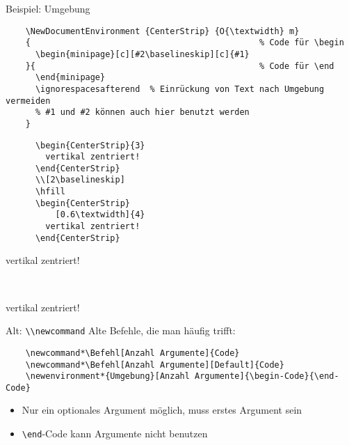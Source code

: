 \begin{frame}[fragile]{Beispiel: Umgebung}
  \begin{lstlisting}
    \NewDocumentEnvironment {CenterStrip} {O{\textwidth} m}
    {                                              % Code für \begin
      \begin{minipage}[c][#2\baselineskip][c]{#1}
    }{                                             % Code für \end
      \end{minipage}
      \ignorespacesafterend  % Einrückung von Text nach Umgebung vermeiden
      % #1 und #2 können auch hier benutzt werden
    }
  \end{lstlisting}

  \begin{CodeExample}{0.5}
    \begin{lstlisting}
      \begin{CenterStrip}{3}
        vertikal zentriert!
      \end{CenterStrip}
      \\[2\baselineskip]
      \hfill
      \begin{CenterStrip}
          [0.6\textwidth]{4}
        vertikal zentriert!
      \end{CenterStrip}
    \end{lstlisting}
  \CodeResult
    \begin{CenterStrip}{3}
      \strut
      vertikal zentriert!
    \end{CenterStrip}
    \\[2\baselineskip]
    \hfill
    \begin{CenterStrip}[0.6\textwidth]{4}
      \strut
      vertikal zentriert!
    \end{CenterStrip}
  \end{CodeExample}
\end{frame}

\begin{frame}[fragile]{Alt: \lstinline+\\newcommand+}
  Alte Befehle, die man häufig trifft:
  \begin{lstlisting}
    \newcommand*\Befehl[Anzahl Argumente]{Code}
    \newcommand*\Befehl[Anzahl Argumente][Default]{Code}
    \newenvironment*{Umgebung}[Anzahl Argumente]{\begin-Code}{\end-Code}
  \end{lstlisting}
  \begin{itemize}
    \item Nur ein optionales Argument möglich, muss erstes Argument sein
    \item \lstinline+\end+-Code kann Argumente nicht benutzen
  \end{itemize}
\end{frame}
